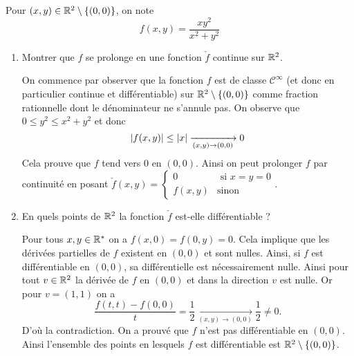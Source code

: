 \documentclass{tp_um}
\begin{document}
\exo{} Pour $(x,y) \in \mathbb{R}^2\setminus\left\{ (0,0) \right\}$, on note 
\[
	f(x,y) = \frac{xy^2}{x^2 + y^2}
\]
\begin{enumerate}
	\item Montrer que $f$ se prolonge en une fonction $\check f$ continue sur $\mathbb{R}^2$.

		\bigskip

On commence par observer que la fonction $f$ est de classe $\mathcal C^\infty$ (et donc en particulier continue et différentiable) sur $\mathbb{R}^2 \setminus \{(0, 0)\}$ comme fraction rationnelle dont le
dénominateur ne s'annule pas. 
On observe que $0 \leq y^2 \leq x^2 + y^2$ et donc
\[
\left\lvert f(x,y)\right\rvert \leq \left\lvert x\right\rvert \xrightarrow[(x,y) \to (0,0)]{} 0 
\]
Cela prouve que $f$ tend vers 0 en $(0,0)$. Ainsi on peut prolonger $f$ par continuité en posant
$\check f (x, y) = \begin{cases} 0 & \text{ si $x=y=0$}  \\ f(x,y) & \text{sinon} \end{cases}$.

		\bigskip




	\item En quels points de $\mathbb{R}^2$ la fonction $\check f$ est-elle différentiable ?
	
		\bigskip


	Pour tous $x, y\in\mathbb{R}^*$ on a $f (x, 0) = f (0, y) = 0$. Cela implique que les dérivées partielles de $f$ existent en $(0,0)$ et sont nulles. Ainsi, si $f$ est différentiable en $(0,0)$, sa différentielle est nécessairement nulle. Ainsi pour tout $v \in\mathbb{R}^2$ la dérivée de $f$ en $(0,0)$ et dans la direction $v$ est nulle. Or pour $v = (1, 1)$ on a
	\[
	\frac{f(t,t) - f(0,0)}{t} = \frac 1 2 \xrightarrow[(x,y) \to (0,0)]{} \frac 1 2 \neq  0.
	\]
	D'où la contradiction. On a prouvé que $f$ n'est pas différentiable en $(0,0)$. Ainsi l'ensemble des points en lesquels $f$ est différentiable est $\mathbb{R}^2 \setminus \{(0, 0)\}$.
\end{enumerate}
\end{document}
